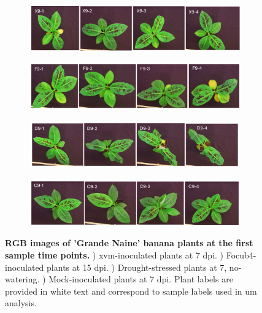 \begin{figure}[ph!]
    \centering
    \begin{subfigure}[b]{\textwidth}
        \includegraphics[width=\textwidth]{Figures/FirstTimePointXanthomonasBLQs.pdf}
        \caption{}
        \label{fig:XvmFirstTimeBLQs}
    \end{subfigure}
     \begin{subfigure}[b]{\textwidth}
        \includegraphics[width=\textwidth]{Figures/FirstTimePointFusariumBLQs.pdf}
        \caption{}
        \label{fig:FocFirstTimeBLQs}
    \end{subfigure}
         \begin{subfigure}[b]{\textwidth}
        \includegraphics[width=\textwidth]{Figures/FirstTimePointDroughtBLQs.pdf}
        \caption{}
        \label{fig:DroFirstTimeBLQs}
    \end{subfigure}
         \begin{subfigure}[b]{\textwidth}
        \includegraphics[width=\textwidth]{Figures/FirstTimePointControlBLQs.pdf}
        \caption{}
        \label{fig:ConFirstTimeBLQs}
    \end{subfigure}
    \caption[RGB images of 'Grande Naine' banana plants at the first sample time points.]{\textbf{RGB images of 'Grande Naine' banana plants at the first sample time points.}
    \textbf{}) \acl{xvm}-inoculated plants at 7 \acl{dpi}.
    \textbf{}) \acl{Focub4}-inoculated plants at 15 \acl{dpi}.
    \textbf{}) Drought-stressed plants at 7, no-watering.
    \textbf{}) Mock-inoculated plants at 7 \ac{dpi}.
    Plant labels are provided in white text and correspond to sample labels used in \acl{um} analysis.
    }
    \label{fig:FirstTimePointSymptoms}
\end{figure}

